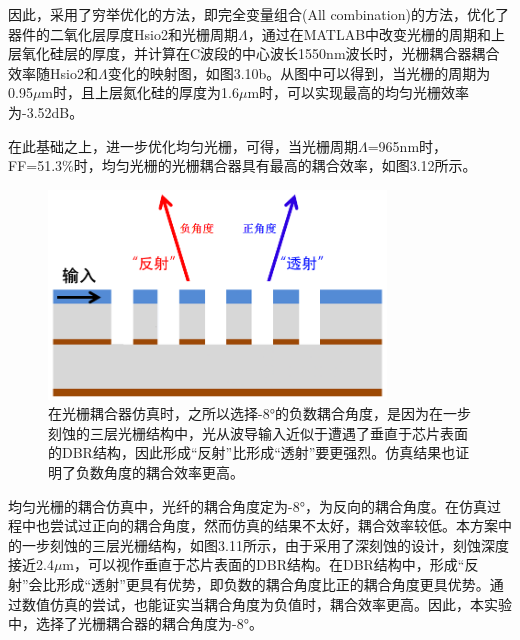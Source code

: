 因此，采用了穷举优化的方法，即完全变量组合(All combination)的方法，优化了器件的二氧化层厚度Hsio2和光栅周期$\Lambda$，通过在MATLAB中改变光栅的周期和上层氧化硅层的厚度，并计算在C波段的中心波长1550nm波长时，光栅耦合器耦合效率随Hsio2和$\Lambda$变化的映射图，如图3.10b。从图中可以得到，当光栅的周期为0.95$\mu$m时，且上层氮化硅的厚度为1.6$\mu$m时，可以实现最高的均匀光栅效率为-3.52dB。

在此基础之上，进一步优化均匀光栅，可得，当光栅周期$\Lambda$=965nm时， FF=51.3\%时，均匀光栅的光栅耦合器具有最高的耦合效率，如图3.12所示。

\begin{figure}[!htbp]
    \centering
    \includegraphics[width=0.8\textwidth]{Img/3-11.png}
    \caption{在光栅耦合器仿真时，之所以选择-8°的负数耦合角度，是因为在一步刻蚀的三层光栅结构中，光从波导输入近似于遭遇了垂直于芯片表面的DBR结构，因此形成“反射”比形成“透射”要更强烈。仿真结果也证明了负数角度的耦合效率更高。}
    \label{fig:3-11}
\end{figure}

均匀光栅的耦合仿真中，光纤的耦合角度定为-8°，为反向的耦合角度。在仿真过程中也尝试过正向的耦合角度，然而仿真的结果不太好，耦合效率较低。本方案中的一步刻蚀的三层光栅结构，如图3.11所示，由于采用了深刻蚀的设计，刻蚀深度接近2.4$\mu$m，可以视作垂直于芯片表面的DBR结构。在DBR结构中，形成“反射”会比形成“透射”更具有优势，即负数的耦合角度比正的耦合角度更具优势。通过数值仿真的尝试，也能证实当耦合角度为负值时，耦合效率更高。因此，本实验中，选择了光栅耦合器的耦合角度为-8°。

